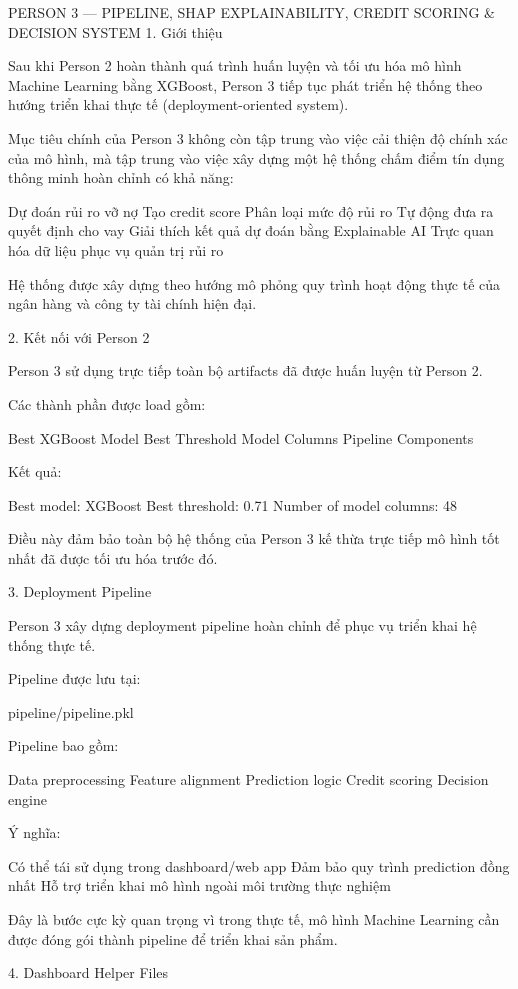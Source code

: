 PERSON 3 — PIPELINE, SHAP EXPLAINABILITY, CREDIT SCORING & DECISION SYSTEM
1. Giới thiệu

Sau khi Person 2 hoàn thành quá trình huấn luyện và tối ưu hóa mô hình Machine Learning bằng XGBoost, Person 3 tiếp tục phát triển hệ thống theo hướng triển khai thực tế (deployment-oriented system).

Mục tiêu chính của Person 3 không còn tập trung vào việc cải thiện độ chính xác của mô hình, mà tập trung vào việc xây dựng một hệ thống chấm điểm tín dụng thông minh hoàn chỉnh có khả năng:

Dự đoán rủi ro vỡ nợ
Tạo credit score
Phân loại mức độ rủi ro
Tự động đưa ra quyết định cho vay
Giải thích kết quả dự đoán bằng Explainable AI
Trực quan hóa dữ liệu phục vụ quản trị rủi ro

Hệ thống được xây dựng theo hướng mô phỏng quy trình hoạt động thực tế của ngân hàng và công ty tài chính hiện đại.

2. Kết nối với Person 2

Person 3 sử dụng trực tiếp toàn bộ artifacts đã được huấn luyện từ Person 2.

Các thành phần được load gồm:

Best XGBoost Model
Best Threshold
Model Columns
Pipeline Components

Kết quả:

Best model: XGBoost
Best threshold: 0.71
Number of model columns: 48

Điều này đảm bảo toàn bộ hệ thống của Person 3 kế thừa trực tiếp mô hình tốt nhất đã được tối ưu hóa trước đó.

3. Deployment Pipeline

Person 3 xây dựng deployment pipeline hoàn chỉnh để phục vụ triển khai hệ thống thực tế.

Pipeline được lưu tại:

pipeline/pipeline.pkl

Pipeline bao gồm:

Data preprocessing
Feature alignment
Prediction logic
Credit scoring
Decision engine

Ý nghĩa:

Có thể tái sử dụng trong dashboard/web app
Đảm bảo quy trình prediction đồng nhất
Hỗ trợ triển khai mô hình ngoài môi trường thực nghiệm

Đây là bước cực kỳ quan trọng vì trong thực tế, mô hình Machine Learning cần được đóng gói thành pipeline để triển khai sản phẩm.

4. Dashboard Helper Files

